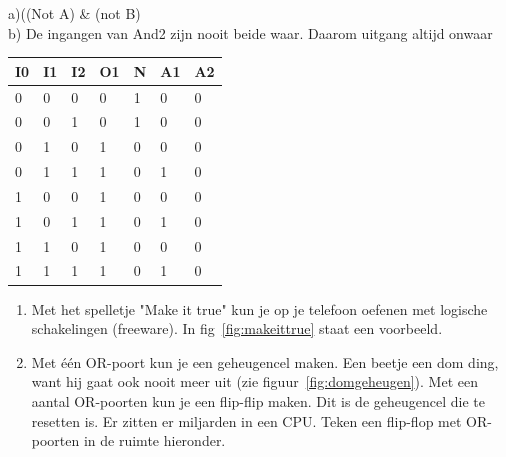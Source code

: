 \documentclass[../../main.tex]{subfiles}
\begin{document}
\begin{antwoord}[-8cm]
{\footnotesize a)((Not A) \& (not B)\\
b)  De ingangen van And2 zijn nooit beide waar. Daarom uitgang altijd onwaar}
{\tiny
\begin{tabular}{|@{\hskip2pt}l@{\hskip2pt}|%
@{\hskip2pt}l@{\hskip2pt}|%
@{\hskip2pt}l@{\hskip2pt}|%
@{\hskip2pt}l@{\hskip2pt}|%
@{\hskip2pt}l@{\hskip2pt}|%
@{\hskip2pt}l@{\hskip2pt}|%
@{\hskip2pt}l@{\hskip2pt}|}
\hline
I0  & I1 & I2 &  O1 & N & A1 & A2 \\ \hline
0   & 0  & 0  &  0  & 1 & 0  & 0  \\ \hline
0   & 0  & 1  &  0  & 1 & 0  & 0  \\ \hline
0   & 1  & 0  &  1  & 0 & 0  & 0  \\ \hline
0   & 1  & 1  &  1  & 0 & 1  & 0  \\ \hline
1   & 0  & 0  &  1  & 0 & 0  & 0  \\ \hline
1   & 0  & 1  &  1  & 0 & 1  & 0  \\ \hline
1   & 1  & 0  &  1  & 0 & 0  & 0  \\ \hline
1   & 1  & 1  &  1  & 0 & 1  & 0  \\ \hline
\end{tabular}
}
\end{antwoord}
\fi%
\iffalse%
\medskip
\begin{opdracht}\label{opd:logica1}%
\begin{enumerate}
\item Met het spelletje "Make it true" kun je op je telefoon oefenen met logische schakelingen (freeware). In fig~\ref{fig:makeittrue} staat een voorbeeld.

\item Met \'e\'en OR-poort kun je een geheugencel maken. Een beetje een dom ding, want hij gaat ook nooit meer uit (zie figuur~\ref{fig:domgeheugen}). Met een aantal OR-poorten kun je een flip-flip maken. Dit is de geheugencel die te resetten is. Er zitten er miljarden in een CPU. Teken een flip-flop met OR-poorten in de ruimte hieronder.
\end{enumerate}

\end{opdracht}
\end{document}
